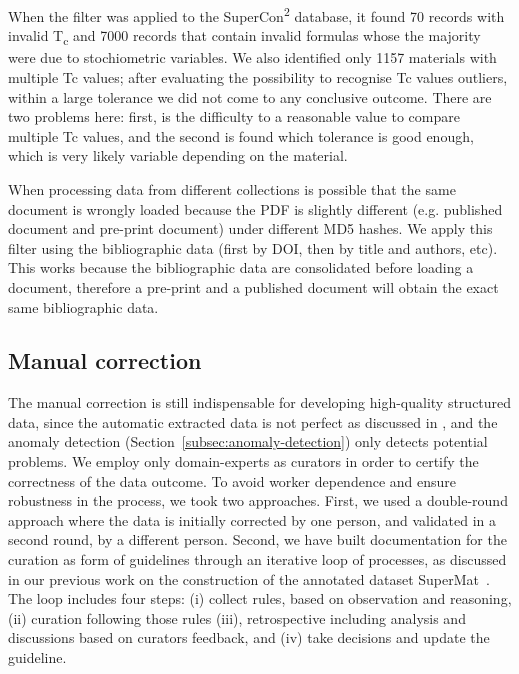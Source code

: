 \documentclass[a4paper]{article}
\begin{document}
When the filter was applied to the SuperCon\textsuperscript{2} database, it found 70 records with invalid T\textsubscript{c} and 7000 records that contain invalid formulas whose the majority were due to stochiometric variables. We also identified only 1157 materials with multiple Tc values; after evaluating the possibility to recognise Tc values outliers, within a large tolerance we did not come to any conclusive outcome. 
There are two problems here: first, is the difficulty to a reasonable value to compare multiple Tc values, and the second is found which tolerance is good enough, which is very likely variable depending on the material. 



When processing data from different collections is possible that the same document is wrongly loaded because the PDF is slightly different (e.g. published document and pre-print document) under different MD5 hashes.  
We apply this filter using the bibliographic data (first by DOI, then by title and authors, etc). This works because the bibliographic data are consolidated before loading a document, therefore a pre-print and a published document will obtain the exact same bibliographic data.


\subsection{Manual correction}
\label{subsec:manual_correction}
The manual correction is still indispensable for developing high-quality structured data, since the automatic extracted data is not perfect as discussed in \cite{lfoppiano2023automatic}, and the anomaly detection (Section~\ref{subsec:anomaly-detection}) only detects potential problems. 
We employ only domain-experts as curators in order to certify the correctness of the data outcome. 
To avoid worker dependence and ensure robustness in the process, we took two approaches. 
First, we used a double-round approach where the data is initially corrected by one person, and validated in a second round, by a different person. 
Second, we have built documentation for the curation as form of guidelines through an iterative loop of processes, as discussed in our previous work on the construction of the annotated dataset SuperMat~\cite{foppiano2021supermat}. 
The loop includes four steps: (i) collect rules, based on observation and reasoning, (ii) curation following those rules (iii), retrospective including analysis and discussions based on curators feedback, and (iv) take decisions and update the guideline.
\end{document}
